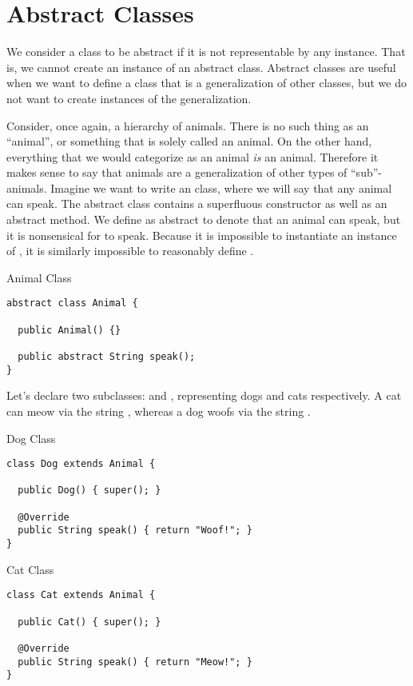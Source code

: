 \section{Abstract Classes}

We consider a class to be abstract if it is not representable by any instance. That is, we cannot create an instance of an abstract class. Abstract classes are useful when we want to define a class that is a generalization of other classes, but we do not want to create instances of the generalization.

\example Consider, once again, a hierarchy of animals. There is no such thing as an ``animal'', or something that is solely called an animal. On the other hand, everything that we would categorize as an animal \textit{is} an animal. Therefore it makes sense to say that animals are a generalization of other types of ``sub''-animals. Imagine we want to write an  class, where we will say that any animal can speak. The abstract class contains a superfluous constructor as well as an abstract  method. We define  as abstract to denote that an animal can speak, but it is nonsensical for  to speak. Because it is impossible to instantiate an instance of , it is similarly impossible to reasonably define .

\begin{cl}{Animal Class}
\begin{lstlisting}[language=MyJava]
abstract class Animal {

  public Animal() {} 

  public abstract String speak();
}
\end{lstlisting}
\end{cl}

Let's declare two subclasses:  and , representing dogs and cats respectively. A cat can meow via the string , whereas a dog woofs via the string . 

\begin{cl}{Dog Class}
\begin{lstlisting}[language=MyJava]
class Dog extends Animal {

  public Dog() { super(); }

  @Override
  public String speak() { return "Woof!"; }
}
\end{lstlisting}
\end{cl}

\begin{cl}{Cat Class}
\begin{lstlisting}[language=MyJava]
class Cat extends Animal {

  public Cat() { super(); }

  @Override
  public String speak() { return "Meow!"; }
}
\end{lstlisting}
\end{cl}

